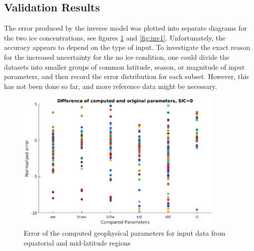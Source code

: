 \documentclass[11pt, a4paper]{article}
\begin{document}

\subsection{Validation Results}

The error produced by the inverse model was plotted into separate diagrams for the two ice concentrations, see figures \ref{fig:inv0} and \ref{fig:inv1}. Unfortunately, the accuracy appears to depend on the type of input. To investigate the exact reason for the increased uncertainty for the no ice condition, one could divide the datasets into smaller groups of common latitude, season, or magnitude of input parameters, and then record the error distribution for each subset. However, this has not been done so far, and more reference data might be necessary.

\begin{figure}[h]
   \centering
   \includegraphics[width=0.9\textwidth]{ValidationInverse_SIC0.eps}
   \caption{Error of the computed geophysical parameters for input data from equatorial and mid-latitude regions}
   \label{fig:inv0}
\end{figure}
\end{document}
